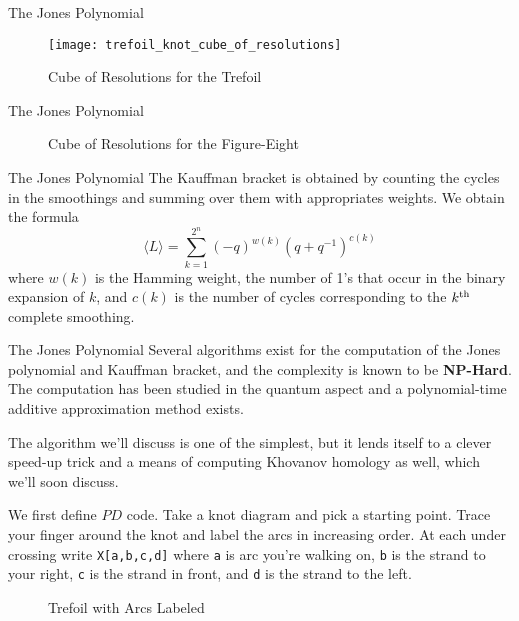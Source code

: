 \documentclass{beamer}
\begin{document}
    \begin{frame}{The Jones Polynomial}
        \begin{figure}
            \centering
            \texttt{[image: trefoil\_knot\_cube\_of\_resolutions]}
            \caption{Cube of Resolutions for the Trefoil}
        \end{figure}
    \end{frame}
    \begin{frame}{The Jones Polynomial}
        \begin{figure}
            \centering
            \caption{Cube of Resolutions for the Figure-Eight}
        \end{figure}
    \end{frame}
    \begin{frame}{The Jones Polynomial}
        The Kauffman bracket is obtained by counting the cycles in the
        smoothings and summing over them with appropriates weights. We obtain
        the formula
        \begin{equation}
            \langle{L}\rangle
            =\sum_{k=1}^{2^{n}}(-q)^{w(k)}(q+q^{-1})^{c(k)}
        \end{equation}
        where $w(k)$ is the Hamming weight, the number of 1's that occur in
        the binary expansion of $k$, and $c(k)$ is the number of cycles
        corresponding to the $k^{\small\textrm{th}}$ complete smoothing.
    \end{frame}
    \begin{frame}{The Jones Polynomial}
        Several algorithms exist for the computation of the Jones polynomial
        and Kauffman bracket, and the complexity is known to be
        \textbf{NP-Hard}. The computation has been studied in the
        quantum aspect and a polynomial-time additive approximation method
        exists.
        \par\hfill\par
        The algorithm we'll discuss is one of the simplest, but it lends itself
        to a clever speed-up trick and a means of computing Khovanov homology
        as well, which we'll soon discuss.
    \end{frame}
    \begin{frame}
        We first define $PD$ code. Take a knot diagram and pick a starting
        point. Trace your finger around the knot and label the arcs in
        increasing order. At each under crossing write
        \texttt{X[a,b,c,d]} where \texttt{a} is arc you're walking on,
        \texttt{b} is the strand to your right, \texttt{c} is the strand
        in front, and \texttt{d} is the strand to the left.
        \begin{figure}
            \centering
            \caption{Trefoil with Arcs Labeled}
        \end{figure}
    \end{frame}
\end{document}
